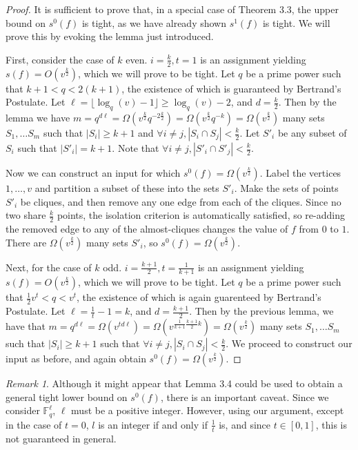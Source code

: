 \documentclass[psamsfonts]{amsart}
\theoremstyle{definition}
\theoremstyle{remark}
\newtheorem{rem}[theorem]{Remark}
\numberwithin{equation}{section}
\begin{document}
	\begin{proof}
		It is sufficient to prove that, in a special case of Theorem 3.3, the upper bound on $s^0(f)$ is tight, as we have already shown $s^{1}(f)$ is tight. We will prove this by evoking the lemma just introduced.

		First, consider the case of $k$ even. $i=\frac{k}{2},t=1$ is an assignment yielding $s(f)=O(v^\frac{k}{2})$, which we will prove to be tight.  Let $q$ be a prime power such that $k+1<q<2(k+1)$, the existence of which is guaranteed by Bertrand's Postulate. Let $\ell=\lfloor\log_q(v)-1\rfloor\geq\log_q(v)-2$, and $d=\frac{k}{2}$. Then by the lemma we have $m=q^{d\ell}=\Omega(v^\frac{k}{2}q^{-2\frac{k}{2}})=\Omega(v^\frac{k}{2}q^{-k})=\Omega(v^\frac{k}{2})$ many sets $S_1,\ldots S_m$ such that $|S_i|\geq k+1$ and $\forall i\neq j , |S_i\cap S_j|<\frac{k}{2}$. Let $S'_i$ be any subset of $S_i$ such that $|S'_i|=k+1$. Note that $\forall i\neq j,|S'_i\cap S'_j|<\frac{k}{2}$.

		Now we can construct an input for which $s^0(f)=\Omega(v^\frac{k}{2})$. Label the vertices $1,\ldots ,v$ and partition a subset of these into the sets $S'_i$. Make the sets of points $S'_i$ be cliques, and then remove any one edge from each of the cliques. Since no two share $\frac{k}{2}$ points, the isolation criterion is automatically satisfied, so re-adding the removed edge to any of the almost-cliques changes the value of $f$ from $0$ to $1$. There are $\Omega(v^\frac{k}{2})$ many sets $S'_i$, so $s^0(f)=\Omega(v^\frac{k}{2})$.

		Next, for the case of $k$ odd.  $i=\frac{k+1}{2},t=\frac{1}{k+1}$ is an assignment yielding\\
$s(f)=O(v^\frac{k}{2})$, which we will prove to be tight. Let $q$ be a prime power such that $\frac{1}{2}v^t<q<v^t$, the existence of which is again guarenteed by Bertrand's Postulate.  Let $\ell=\frac{1}{t}-1=k$, and $d=\frac{k+1}{2}$. Then by the previous lemma, we have that $m=q^{d\ell}=\Omega(v^{td\ell})=\Omega(v^{\frac{1}{k+1}\frac{k+1}{2}k})=\Omega(v^\frac{k}{2})$ many sets $S_1,\ldots S_m$ such that $|S_i|\geq k+1$ such that $\forall i\neq j,|S_i\cap S_j|<\frac{k}{2}$. We proceed to construct our input as before, and again obtain $s^0(f)=\Omega(v^\frac{k}{2})$.
	\end{proof}

	\begin{rem}
		Although it might appear that Lemma 3.4 could be used to obtain a general tight lower bound on $s^0(f)$, there is an important caveat. Since we consider $\mathbb{F}^\ell_q$, $\ell$ must be a positive integer. However, using our argument, except in the case of $t=0$, $l$ is an integer if and only if $\frac{1}{t}$ is, and since $t\in[0,1]$, this is not guaranteed in general.
	\end{rem}
\end{document}
